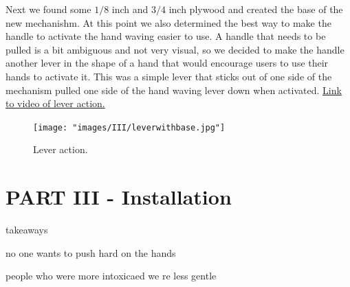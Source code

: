 \documentclass[11pt]{report}
\begin{document}
Next we found some $1/8$ inch and $3/4$ inch plywood and created the base of the new mechanishm. At this point we also determined the best way to make the handle to activate the hand waving easier to use. A handle that needs to be pulled is a bit ambiguous and not very visual, so we decided to make the handle another lever in the shape of a hand that would encourage users to use their hands to activate it. This was a simple lever that sticks out of one side of the mechanism pulled one side of the hand waving lever down when activated. \href{https://drive.google.com/file/d/1A4jMRefTUcI-PZPhbS6XSqFU6V4kzS8j/view?usp=sharing}{Link to video of lever action.}

\begin{figure}[ht!]
\centering
\texttt{[image: "images/III/leverwithbase.jpg"]}
\caption{Lever action.}
\end{figure}

  


\clearpage
\section*{PART III - Installation}


takeaways

no one wants to push hard on the hands

people who were more intoxicaed we re less gentle
\end{document}
